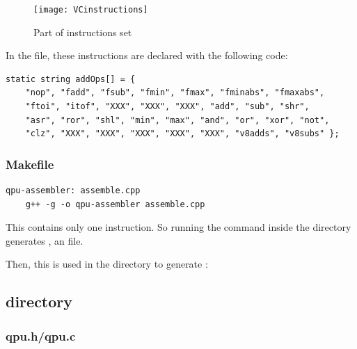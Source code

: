 \begin{figure}[!htbp]
	\centering
	\texttt{[image: VCinstructions]}
	\caption{Part of \vc{} instructions set}
	\label{VCinstructionsFigure}
\end{figure}
\FloatBarrier

In the  file, these instructions are declared with the following  code:

\begin{lstlisting}
static string addOps[] = {
    "nop", "fadd", "fsub", "fmin", "fmax", "fminabs", "fmaxabs",
    "ftoi", "itof", "XXX", "XXX", "XXX", "add", "sub", "shr",
    "asr", "ror", "shl", "min", "max", "and", "or", "xor", "not",
    "clz", "XXX", "XXX", "XXX", "XXX", "XXX", "v8adds", "v8subs" };
\end{lstlisting}



\subsubsection{Makefile}

\begin{lstlisting}
qpu-assembler: assemble.cpp
	g++ -g -o qpu-assembler assemble.cpp
\end{lstlisting}

This  contains only one instruction. So running the  command inside the  directory generates , an  file.
\vspace{5 mm}

Then, this  is used in the  directory to generate :

\vspace{5 mm}



\subsection{ directory}

\subsubsection{qpu.h/qpu.c}


